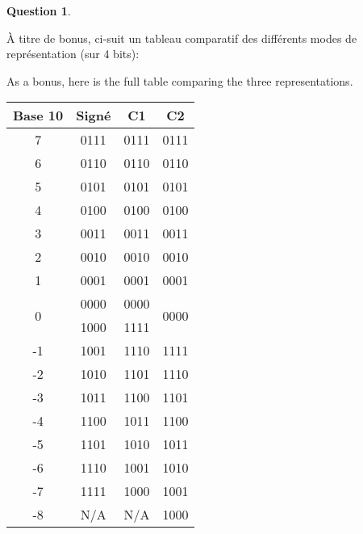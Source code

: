 \documentclass[11pt,a4paper]{article}
\theoremstyle{definition}%
\newtheorem{Q}{Question}[] %
\newcommand{\fr}[1]{
 	\ifthenelse {\boolean{fr}} {#1} {}
 }
\newcommand{\en}[1]{
 	\ifthenelse {\boolean{en}} {#1} {}
 }
\begin{document}
\begin{Q}
\begin{enumerate}
{		\fr{À titre de bonus, ci-suit un tableau comparatif des différents modes de représentation (sur 4 bits):}
		\en{As a bonus, here is the full table comparing the three representations.}
		\begin{center}
			\begin{tabular}{|c|c|c|c|} \hline
				Base 10 & Signé & C1 & C2 \\ \hline
				7 & 0111 & 0111 & 0111 \\ \hline
				6 & 0110 & 0110 & 0110 \\ \hline
				5 & 0101 & 0101 & 0101 \\ \hline
				4 & 0100 & 0100 & 0100 \\ \hline
				3 & 0011 & 0011 & 0011 \\ \hline
				2 & 0010 & 0010 & 0010 \\ \hline
				1 & 0001 & 0001 & 0001 \\ \hline
				\multirow{2}{*}{0} & 0000 & 0000 & \multirow{2}{*}{0000} \\
				& 1000 & 1111 & \\ \hline
				-1 & 1001 & 1110 & 1111 \\ \hline
				-2 & 1010 & 1101 & 1110 \\ \hline
				-3 & 1011 & 1100 & 1101 \\ \hline
				-4 & 1100 & 1011 & 1100 \\ \hline
				-5 & 1101 & 1010 & 1011 \\ \hline
				-6 & 1110 & 1001 & 1010 \\ \hline
				-7 & 1111 & 1000 & 1001 \\ \hline
				-8 & N/A & N/A & 1000 \\ \hline
			\end{tabular}
		\end{center}
	}
\end{enumerate}
\end{Q}
\end{document}

